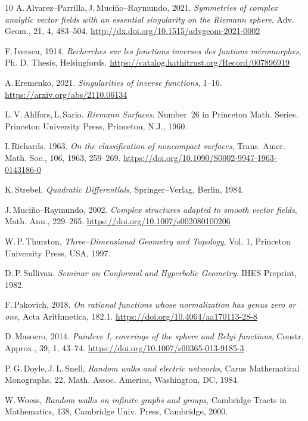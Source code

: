 \documentclass[final,3p,times]{elsarticle}
\theoremstyle{definition}
\begin{document}
\begin{thebibliography}{10}
A.\,Alvarez--Parrilla,\,J.\,Muci\~no--Raymundo, 
2021.
\emph{Symmetries of complex analytic vector fields with an essential 
singularity on the Riemann sphere}, 
Adv. Geom., 
21, 4, 
483--504.
\url{http://dx.doi.org/10.1515/advgeom-2021-0002}

F.\,Iversen,
1914.
\emph{Recherches sur les fonctions inverses des
fontions m\'eromorphes}, 
Ph. D. Thesis, Helsingfords.
\url{https://catalog.hathitrust.org/Record/007896919} 

A.\,Eremenko, 
2021.
\emph{Singularities of inverse functions},
1--16.
\url{https://arxiv.org/abs/2110.06134}

L.\,V.\,Ahlfors,\,L.\,Sario.
\emph{Riemann Surfaces}.
Number~26 in Princeton Math. Series. Princeton University Press,
Princeton, N.J., 1960.

I.\,Richards.
1963.
\emph{On the classification of noncompact surfaces},
{Trans. Amer. Math. Soc.}, 106, 1963, 259--269.
\url{https://doi.org/10.1090/S0002-9947-1963-0143186-0}

K.\,Strebel, 
\emph{Quadratic Differentials}, 
Springer--Verlag, Berlin, 
1984.

J.\,Muci\~no--Raymundo, 
2002.
\emph{Complex structures adapted to smooth vector fields},
Math. Ann., 
229--265.
\url{https://doi.org/10.1007/s002080100206}

W.\,P.\,Thurston,
\emph{Three--Dimensional Geometry and Topology}, Vol. 1,
Princeton University Press, 
USA, 1997.

D.\,P.\,Sullivan.
\newblock \emph{Seminar on Conformal and Hyperbolic Geometry}.
\newblock IHES Preprint, 1982.

F.\,Pakovich,
2018.
\emph{On rational functions whose normalization
has genus zero or one}, 
Acta Arithmetica,
182.1.
\url{https://doi.org/10.4064/aa170113-28-8}

D.\,Masoero,
2014. 
\emph{Painleve I, coverings of the sphere and Belyi functions},
Constr. Approx., 
39, 1, 43--74.
\url{https://doi.org/10.1007/s00365-013-9185-3}

P.\,G.\,Doyle,\,J.\,L.\,Snell, 
\emph{Random walks and electric networks}, 
Carus Mathematical Monographs, 22, 
Math. Assoc. America, Washington, DC, 
1984.

W.\,Woess, 
\emph{Random walks on infinite graphs and groups}, 
Cambridge Tracts in Mathematics, 138, 
Cambridge Univ. Press, Cambridge, 
2000.


\end{thebibliography}
\end{document}
